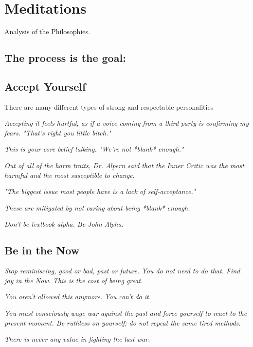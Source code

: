 \documentclass[12pt]{article}
\begin{document}
\pagebreak


\section*{Meditations}

Analysis of the Philosophies.  

\subsection*{The process is the goal:}


\pagebreak

\subsection*{Accept Yourself}

There are many different types of strong and respectable personalities

\textit{Accepting it feels hurtful, as if a voice coming from a third party is confirming my fears.  "That's right you little bitch."}

\textit{This is your core belief talking.  "We're not *blank* enough."}

\textit{Out of all of the harm traits, Dr. Alpern said that the Inner Critic was the most harmful and the most susceptible to change.}

\textit{"The biggest issue most people have is a lack of self-acceptance."}

\textit{These are mitigated by not caring about being *blank* enough.}

\textit{Don't be textbook alpha.  Be John Alpha.}

\pagebreak




\subsection*{Be in the Now}


\textit{Stop reminiscing, good or bad, past or future.  You do not need to do that.  Find joy in the Now.  This is the cost of being great.}

\textit{You aren't allowed this anymore.  You can't do it.}

\textit{You must consciously wage war against the past and force yourself to react to the present moment. Be ruthless on yourself; do not repeat the same tired methods.}

\textit{There is never any value in fighting the last war.}
\end{document}
